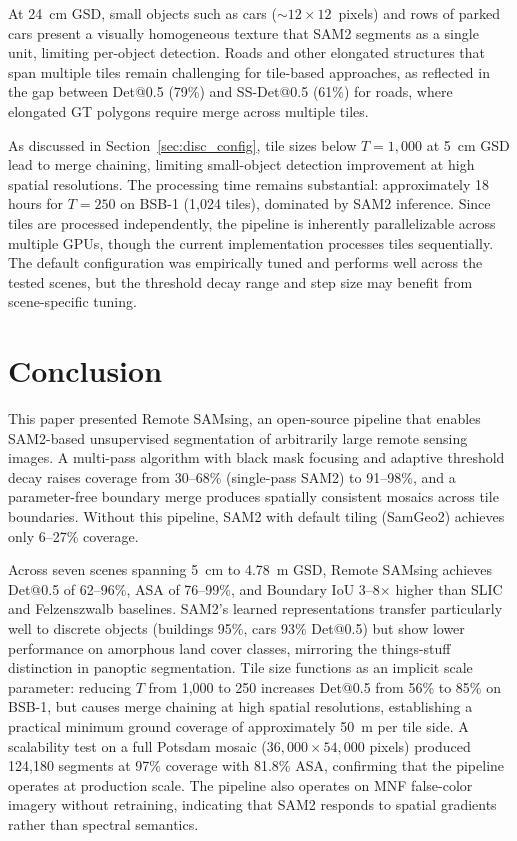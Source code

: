 \documentclass[review,11pt,authoryear]{elsarticle}
\begin{document}
At 24~cm GSD, small objects such as cars (${\sim}12 \times 12$~pixels) and rows of parked cars present a visually homogeneous texture that SAM2 segments as a single unit, limiting per-object detection. Roads and other elongated structures that span multiple tiles remain challenging for tile-based approaches, as reflected in the gap between Det@0.5 (79\%) and SS-Det@0.5 (61\%) for roads, where elongated GT polygons require merge across multiple tiles.

As discussed in Section~\ref{sec:disc_config}, tile sizes below $T = 1{,}000$ at 5~cm GSD lead to merge chaining, limiting small-object detection improvement at high spatial resolutions. The processing time remains substantial: approximately 18 hours for $T = 250$ on BSB-1 (1{,}024 tiles), dominated by SAM2 inference. Since tiles are processed independently, the pipeline is inherently parallelizable across multiple GPUs, though the current implementation processes tiles sequentially. The default configuration was empirically tuned and performs well across the tested scenes, but the threshold decay range and step size may benefit from scene-specific tuning.


\section{Conclusion}
\label{sec:conclusion}

This paper presented Remote SAMsing, an open-source pipeline that enables SAM2-based unsupervised segmentation of arbitrarily large remote sensing images. A multi-pass algorithm with black mask focusing and adaptive threshold decay raises coverage from 30--68\% (single-pass SAM2) to 91--98\%, and a parameter-free boundary merge produces spatially consistent mosaics across tile boundaries. Without this pipeline, SAM2 with default tiling (SamGeo2) achieves only 6--27\% coverage.

Across seven scenes spanning 5~cm to 4.78~m GSD, Remote SAMsing achieves Det@0.5 of 62--96\%, ASA of 76--99\%, and Boundary IoU 3--8$\times$ higher than SLIC and Felzenszwalb baselines. SAM2's learned representations transfer particularly well to discrete objects (buildings 95\%, cars 93\% Det@0.5) but show lower performance on amorphous land cover classes, mirroring the things-stuff distinction in panoptic segmentation. Tile size functions as an implicit scale parameter: reducing $T$ from 1{,}000 to 250 increases Det@0.5 from 56\% to 85\% on BSB-1, but causes merge chaining at high spatial resolutions, establishing a practical minimum ground coverage of approximately 50~m per tile side. A scalability test on a full Potsdam mosaic ($36{,}000 \times 54{,}000$ pixels) produced 124{,}180 segments at 97\% coverage with 81.8\% ASA, confirming that the pipeline operates at production scale. The pipeline also operates on MNF false-color imagery without retraining, indicating that SAM2 responds to spatial gradients rather than spectral semantics.
\end{document}
